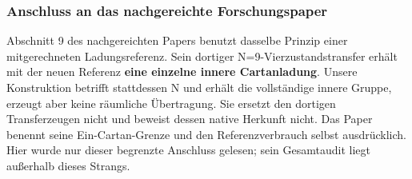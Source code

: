 \subsubsection{Anschluss an das nachgereichte
Forschungspaper}\label{anschluss-an-das-nachgereichte-forschungspaper}

Abschnitt 9 des nachgereichten Papers benutzt dasselbe Prinzip einer
mitgerechneten Ladungsreferenz. Sein dortiger N=9-Vierzustandstransfer
erhält mit der neuen Referenz \textbf{eine einzelne innere
Cartanladung}. Unsere Konstruktion betrifft stattdessen N und erhält die
vollständige innere Gruppe, erzeugt aber keine räumliche Übertragung.
Sie ersetzt den dortigen Transferzeugen nicht und beweist dessen native
Herkunft nicht. Das Paper benennt seine Ein-Cartan-Grenze und den
Referenzverbrauch selbst ausdrücklich. Hier wurde nur dieser begrenzte
Anschluss gelesen; sein Gesamtaudit liegt außerhalb dieses Strangs.

